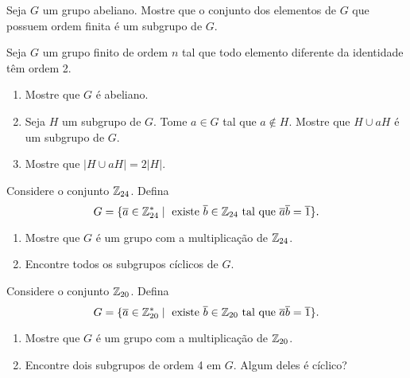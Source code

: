 \documentclass[12pt]{exam}
\begin{document}
    \vspace{.3cm}

    \questao{} Seja $G$ um grupo abeliano. Mostre que o conjunto dos elementos de $G$ que possuem ordem finita é um subgrupo de $G$.

    \vspace{.3cm}

    \questao{} Seja $G$ um grupo finito de ordem $n$ tal que todo elemento diferente da identidade têm ordem 2.
    \begin{enumerate}[label={\alph*})]
        \item Mostre que $G$ é abeliano.

        \item Seja $H$ um subgrupo de $G$. Tome $a \in G$ tal que $a \notin H$. Mostre que $H \cup aH$ é um subgrupo de $G$.

        \item Mostre que $|H \cup aH| = 2|H|$.
    \end{enumerate}

    \vspace{.3cm}

    \questao{} Considere o conjunto $\mathbb{Z}_{24}$. Defina
    \[
        G = \{ \overline{a} \in \mathbb{Z}_{24}^* \mid \mbox{ existe } \overline{b} \in \mathbb{Z}_{24} \mbox{ tal que } \overline{a}\overline{b} = \overline{1}\}.
    \]
    \begin{enumerate}[label={\alph*})]
        \item  Mostre que $G$ é um grupo com a multiplicação de $\mathbb{Z}_{24}$.

        \item Encontre todos os subgrupos cíclicos de $G$.
    \end{enumerate}

    \vspace{.3cm}

    \questao{} Considere o conjunto $\mathbb{Z}_{20}$. Defina
    \[
        G = \{ \overline{a} \in \mathbb{Z}_{20}^* \mid \mbox{ existe } \overline{b} \in \mathbb{Z}_{20} \mbox{ tal que } \overline{a}\overline{b} = \overline{1}\}.
    \]
    \begin{enumerate}[label={\alph*})]
        \item  Mostre que $G$ é um grupo com a multiplicação de $\mathbb{Z}_{20}$.

        \item Encontre dois subgrupos de ordem 4 em $G$. Algum deles é cíclico?
    \end{enumerate}
\end{document}
